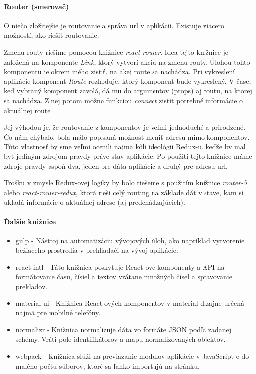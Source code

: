 
\paragraph{Router (smerovač)}
O niečo zložitejšie je routovanie a správa url v aplikácii. Existuje viacero možností, ako riešiť routovanie. 

Zmenu routy riešime pomocou knižnice \emph{react-router}. %
Idea tejto knižnice je založená na komponente \emph{Link}, ktorý vytvorí akciu na zmenu routy. Úlohou tohto komponentu je okrem iného zistiť, na akej route sa nachádza. 
Pri vykreslení aplikácie komponent \emph{Route} rozhoduje, ktorý komponent bude vykreslený. %
V čase, keď vybraný komponent zavolá, dá mu do argumentov (props) aj routu, na ktorej sa nachádza. Z nej potom možno funkciou \emph{connect} zistiť potrebné informácie o aktuálnej route. %

Jej výhodou je, že routovanie z komponentov je veľmi jednoduché a prirodzené. Čo nám chýbalo, bola málo popísaná možnosť meniť adresu mimo komponentov. Túto vlastnosť by sme veľmi ocenili najmä kôli ideológii Redux-u, keďže by mal byť jediným zdrojom pravdy práve stav aplikácie. Po použití tejto knižnice máme zdroje pravdy aspoň dva, jeden pre dáta aplikácie a druhý pre adresu url. 


Trošku  v zmysle Redux-ovej logiky by bolo riešenie s použitím knižnice \emph{router-5} alebo \emph{react-router-redux}, ktorá rieši celý routing na základe dát v stave, kam si ukladá informácie o aktuálnej adrese (aj predchádzajúcich).

\paragraph{Ďalšie knižnice}
\begin{itemize}
  \item gulp \cite{gulp} - Nástroj na automatizáciu vývojových úloh, ako napríklad vytvorenie bežiaceho prostredia v prehliadači na vývoj aplikácie.
  \item react-intl \cite{intl} - Táto knižnica poskytuje React-ové komponenty a API na formátovanie času, čísiel a textov vrátane množných čísel a spravovanie prekladov.
  \item material-ui \cite{material-ui} - Knižnica React-ových komponentov v material dizajne určená najmä pre mobilné telefóny. %
  \item normalizr \cite{normalizr} - Knižnica normalizuje dáta vo formáte JSON podľa zadanej schémy. Vráti pole identifikátorov a mapu normalizovaných objektov.
  \item webpack \cite{webpack} - Knižnica slúži na previazanie modulov aplikácie v JavaScript-e do malého počtu súborov, ktoré sa ľahko importujú na stránku.
\end{itemize}